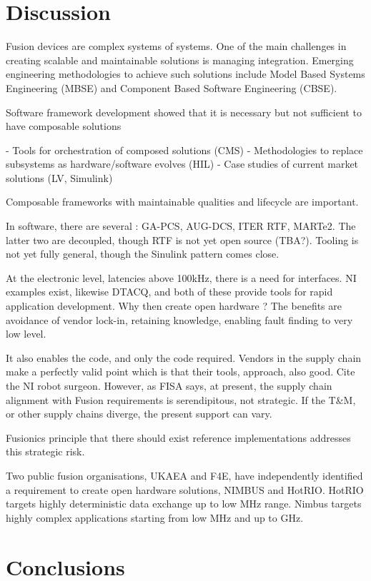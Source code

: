 \documentclass[preprint]{elsarticle}
\begin{document}
\section{Discussion}

Fusion devices are complex systems of systems. One of the main challenges
in creating scalable and maintainable solutions is managing integration.
Emerging engineering methodologies to achieve such solutions 
include Model Based Systems Engineering (MBSE) and 
Component Based Software Engineering (CBSE).

Software framework development showed that it is necessary but not sufficient to have composable solutions

- Tools for orchestration of composed solutions (CMS)
- Methodologies to replace subsystems as hardware/software evolves (HIL)
- Case studies of current market solutions (LV, Simulink)

Composable frameworks with maintainable qualities and lifecycle are important.

In software, there are several : GA-PCS, AUG-DCS, ITER RTF, MARTe2.  The latter 
two are decoupled, though RTF is not yet open source (TBA?).  Tooling is not
yet fully general, though the Sinulink pattern comes close.

At the electronic level, latencies above 100kHz, there is a need for
interfaces.  NI examples exist, likewise DTACQ, and both of these 
provide tools for rapid application development.  Why then create
open hardware ?  The benefits are avoidance of vendor lock-in, 
retaining knowledge, enabling fault finding to very low level.

It also enables the code, and only the code required.
Vendors in the supply chain make a perfectly valid point
which is that their tools, approach, also good.
Cite the NI robot surgeon.
However, as FISA says, at present, the supply chain alignment
with Fusion requirements is serendipitous, not strategic.
If the T&M, or other supply chains diverge, the present
support can vary.  

Fusionics principle that there should exist reference implementations
addresses this strategic risk.

Two public fusion organisations, UKAEA and F4E, have independently identified 
a requirement to create open hardware solutions, NIMBUS and HotRIO.
HotRIO targets highly deterministic data exchange up to low MHz range.
Nimbus targets highly complex applications starting from low MHz and
up to GHz.  

\section{Conclusions}
\end{document}
